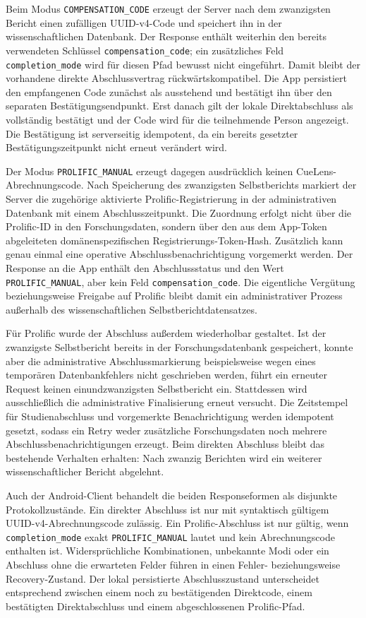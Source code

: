 \begin{neu}
Beim Modus \texttt{COMPENSATION\_CODE} erzeugt der Server nach dem zwanzigsten Bericht einen zufälligen UUID-v4-Code und speichert ihn in der wissenschaftlichen Datenbank. Der Response enthält weiterhin den bereits verwendeten Schlüssel \texttt{compensation\_code}; ein zusätzliches Feld \texttt{completion\_mode} wird für diesen Pfad bewusst nicht eingeführt. Damit bleibt der vorhandene direkte Abschlussvertrag rückwärtskompatibel. Die App persistiert den empfangenen Code zunächst als ausstehend und bestätigt ihn über den separaten Bestätigungsendpunkt. Erst danach gilt der lokale Direktabschluss als vollständig bestätigt und der Code wird für die teilnehmende Person angezeigt. Die Bestätigung ist serverseitig idempotent, da ein bereits gesetzter Bestätigungszeitpunkt nicht erneut verändert wird.

Der Modus \texttt{PROLIFIC\_MANUAL} erzeugt dagegen ausdrücklich keinen CueLens-Abrechnungscode. Nach Speicherung des zwanzigsten Selbstberichts markiert der Server die zugehörige aktivierte Prolific-Registrierung in der administrativen Datenbank mit einem Abschlusszeitpunkt. Die Zuordnung erfolgt nicht über die Prolific-ID in den Forschungsdaten, sondern über den aus dem App-Token abgeleiteten domänenspezifischen Registrierungs-Token-Hash. Zusätzlich kann genau einmal eine operative Abschlussbenachrichtigung vorgemerkt werden. Der Response an die App enthält den Abschlussstatus und den Wert \texttt{PROLIFIC\_MANUAL}, aber kein Feld \texttt{compensation\_code}. Die eigentliche Vergütung beziehungsweise Freigabe auf Prolific bleibt damit ein administrativer Prozess außerhalb des wissenschaftlichen Selbstberichtdatensatzes.

Für Prolific wurde der Abschluss außerdem wiederholbar gestaltet. Ist der zwanzigste Selbstbericht bereits in der Forschungsdatenbank gespeichert, konnte aber die administrative Abschlussmarkierung beispielsweise wegen eines temporären Datenbankfehlers nicht geschrieben werden, führt ein erneuter Request keinen einundzwanzigsten Selbstbericht ein. Stattdessen wird ausschließlich die administrative Finalisierung erneut versucht. Die Zeitstempel für Studienabschluss und vorgemerkte Benachrichtigung werden idempotent gesetzt, sodass ein Retry weder zusätzliche Forschungsdaten noch mehrere Abschlussbenachrichtigungen erzeugt. Beim direkten Abschluss bleibt das bestehende Verhalten erhalten: Nach zwanzig Berichten wird ein weiterer wissenschaftlicher Bericht abgelehnt.

Auch der Android-Client behandelt die beiden Responseformen als disjunkte Protokollzustände. Ein direkter Abschluss ist nur mit syntaktisch gültigem UUID-v4-Abrechnungscode zulässig. Ein Prolific-Abschluss ist nur gültig, wenn \texttt{completion\_mode} exakt \texttt{PROLIFIC\_MANUAL} lautet und kein Abrechnungscode enthalten ist. Widersprüchliche Kombinationen, unbekannte Modi oder ein Abschluss ohne die erwarteten Felder führen in einen Fehler- beziehungsweise Recovery-Zustand. Der lokal persistierte Abschlusszustand unterscheidet entsprechend zwischen einem noch zu bestätigenden Direktcode, einem bestätigten Direktabschluss und einem abgeschlossenen Prolific-Pfad.


\end{neu}
